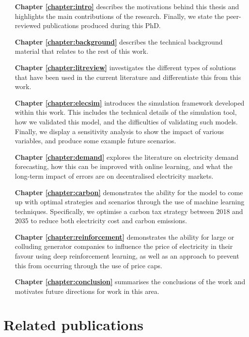 \begin{itemize}[itemindent=3em]
	\item[\textbf{Chapter \ref{chapter:intro}}] describes the motivations behind this thesis and highlights the main contributions of the research. Finally, we state the peer-reviewed publications produced during this PhD. 
	\item[\textbf{Chapter \ref{chapter:background}}] describes the technical background material that relates to the rest of this work.
	\item[\textbf{Chapter \ref{chapter:litreview}}] investigates the different types of solutions that have been used in the current literature and differentiate this from this work. 
	\item[\textbf{Chapter \ref{chapter:elecsim}}] introduces the simulation framework developed within this work. This includes the technical details of the simulation tool, how we validated this model, and the difficulties of validating such models. Finally, we display a sensitivity analysis to show the impact of various variables, and produce some example future scenarios.
	\item[\textbf{Chapter \ref{chapter:demand}}] explores the literature on electricity demand forecasting, how this can be improved with online learning, and what the long-term impact of errors are on decentralised electricity markets.
	\item[\textbf{Chapter \ref{chapter:carbon}}] demonstrates the ability for the model to come up with optimal strategies and scenarios through the use of machine learning techniques. Specifically, we optimise a carbon tax strategy between 2018 and 2035 to reduce both electricity cost and carbon emissions.
	\item[\textbf{Chapter \ref{chapter:reinforcement}}] demonstrates the ability for large or colluding generator companies to influence the price of electricity in their favour using deep reinforcement learning, as well as an approach to prevent this from occurring through the use of price caps.
	\item[\textbf{Chapter \ref{chapter:conclusion}}] summarises the conclusions of the work and motivates future directions for work in this area.
\end{itemize}




\section{Related publications}

